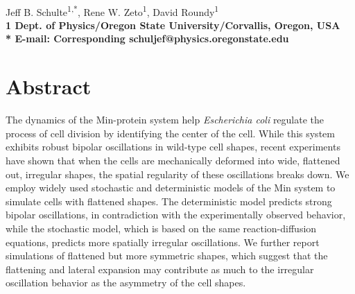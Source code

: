 \documentclass[10pt,letterpaper]{article}
\date{}
\begin{document}
\vspace*{0.35in}

\begin{flushleft}
{\Large
\textbf{}
}
\newline
\\
Jeff B. Schulte\textsuperscript{1,*},
Rene W. Zeto\textsuperscript{1},
David Roundy\textsuperscript{1}
\\
\bf{1} Dept. of Physics/Oregon State University/Corvallis, Oregon, USA
\\

% 
%

* E-mail: Corresponding schuljef@physics.oregonstate.edu
\end{flushleft}
\section*{Abstract}
  The dynamics of the Min-protein system help \emph{Escherichia coli}
  regulate the process of cell division by identifying the center of
  the cell.  While this system exhibits robust bipolar oscillations in
  wild-type cell shapes, recent experiments have shown that when the
  cells are mechanically deformed into wide, flattened out, irregular
  shapes, the spatial regularity of these oscillations breaks down. We
  employ widely used stochastic and deterministic models of the Min
  system to simulate cells with flattened shapes.  The deterministic
  model predicts strong bipolar oscillations, in contradiction with
  the experimentally observed behavior, while the stochastic model,
  which is based on the same reaction-diffusion equations,
  predicts more spatially irregular oscillations.
  We further report simulations of flattened but more symmetric
  shapes, which suggest that the flattening and lateral expansion may
  contribute as much to the irregular oscillation behavior as the
  asymmetry of the cell shapes.

\end{document}
